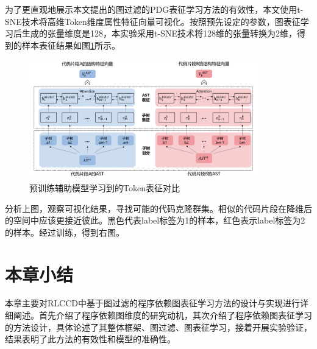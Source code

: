 为了更直观地展示本文提出的图过滤的PDG表征学习方法的有效性，本文使用t-SNE技术将高维Token维度属性特征向量可视化。按照预先设定的参数，图表征学习后生成的张量维度是128，本实验采用t-SNE技术将128维的张量转换为2维，得到的样本表征结果如图\ref{fig:pdgresult}所示。

\begin{figure}[H]
  \centering
  \includegraphics[width=0.9\textwidth]{figures/token}
  \caption{预训练辅助模型学习到的Token表征对比}\label{fig:pdgresult}
\end{figure}

分析上图，观察可视化结果，寻找可能的代码克隆群集。相似的代码片段在降维后的空间中应该更接近彼此。黑色代表label标签为1的样本，红色表示label标签为2的样本。经过训练，得到右图。

\section{本章小结}
\label{sec:Summary5}
本章主要对RLCCD中基于图过滤的程序依赖图表征学习方法的设计与实现进行详细阐述。首先介绍了程序依赖图维度的研究动机，其次介绍了程序依赖图表征学习的方法设计，具体论述了其整体框架、图过滤、图表征学习，接着开展实验验证，结果表明了此方法的有效性和模型的准确性。



